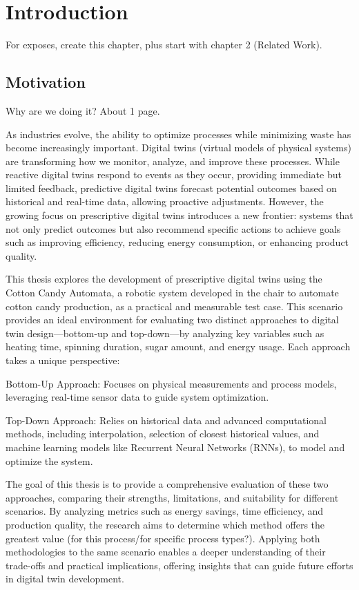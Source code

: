 \chapter{Introduction}
\label{sec:intro}

For exposes, create this chapter, plus start with chapter 2 (Related Work).

\section{Motivation}
\label{sec:intro:mo}

Why are we doing it? About 1 page.

As industries evolve, the ability to optimize processes while minimizing waste has become increasingly important. Digital twins (virtual models of physical systems) are transforming how we monitor, analyze, and improve these processes. While reactive digital twins respond to events as they occur, providing immediate but limited feedback, predictive digital twins forecast potential outcomes based on historical and real-time data, allowing proactive adjustments. However, the growing focus on prescriptive digital twins introduces a new frontier: systems that not only predict outcomes but also recommend specific actions to achieve goals such as improving efficiency, reducing energy consumption, or enhancing product quality.

This thesis explores the development of prescriptive digital twins using the Cotton Candy Automata, a robotic system developed in the chair to automate cotton candy production, as a practical and measurable test case. This scenario provides an ideal environment for evaluating two distinct approaches to digital twin design—bottom-up and top-down—by analyzing key variables such as heating time, spinning duration, sugar amount, and energy usage. Each approach takes a unique perspective:

Bottom-Up Approach: Focuses on physical measurements and process models, leveraging real-time sensor data to guide system optimization.

Top-Down Approach: Relies on historical data and advanced computational methods, including interpolation, selection of closest historical values, and machine learning models like Recurrent Neural Networks (RNNs), to model and optimize the system.

The goal of this thesis is to provide a comprehensive evaluation of these two approaches, comparing their strengths, limitations, and suitability for different scenarios. By analyzing metrics such as energy savings, time efficiency, and production quality, the research aims to determine which method offers the greatest value (for this process/for specific process types?). Applying both methodologies to the same scenario enables a deeper understanding of their trade-offs and practical implications, offering insights that can guide future efforts in digital twin development.

